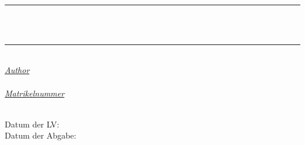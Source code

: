 \begin{titlepage}
    \newcommand{\HRule}{\rule{\linewidth}{0.5mm}}
    \centering

    \textsc{\titelLV}\\[0.8cm]
    \HRule\\[0.7cm]
        {\huge\bfseries \untertitela}\\[0.4cm]
    \HRule\\[2.0cm]

    \large
    \textit{\underline{Author}}\\[0.3cm]
    \textsc{\name}\\[0.5cm]
    \textit{\underline{Matrikelnummer}}\\[0.3cm]
    \matrikel\\
    \vfill\vfill\vfill

    \begin{flushleft}
        \begin{minipage}{0.6\textwidth}
            Datum der LV: \dateofLV\\[0.3cm]
            Datum der Abgabe: \deadline\\[0.5cm]
        \end{minipage}
    \end{flushleft}
\end{titlepage}